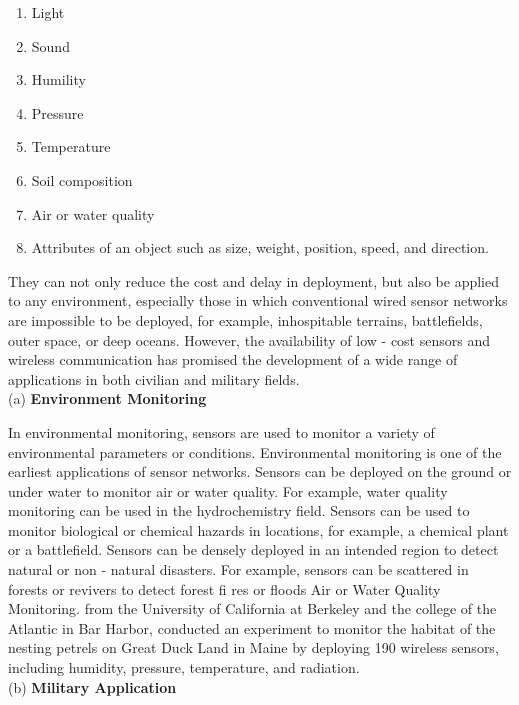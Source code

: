 \begin{enumerate}[label=\roman*]
  \item Light
\item Sound
\item Humility
\item Pressure
\item Temperature
\item Soil composition
\item Air or water quality
\item Attributes of an object such as size, weight, position, speed, and direction.
\end{enumerate}

They can not only reduce the cost and delay in deployment, but also be applied to any environment, especially those in which conventional wired sensor networks are impossible to be deployed, for example, inhospitable terrains, battlefields, outer space, or deep oceans. However, the availability of low - cost sensors and wireless communication has promised the development of a wide range of applications in both civilian and military fields.\\

(a) \textbf{Environment Monitoring}

In environmental monitoring, sensors are used to monitor a variety of environmental parameters or conditions. Environmental monitoring is one of the earliest applications of sensor networks. Sensors can be deployed on the ground or under water to monitor air or water quality. For example, water quality monitoring can be used in the hydrochemistry field. Sensors can be used to monitor biological or chemical hazards in locations, for example, a chemical plant or a battlefield. Sensors can be densely deployed in an intended region to detect natural or non - natural disasters. For example, sensors can be scattered in forests or revivers to detect forest fi res or floods Air or Water Quality Monitoring. from the University of California at Berkeley and the college of the Atlantic in Bar Harbor, conducted an experiment to monitor the habitat of the nesting petrels on Great Duck Land in Maine by deploying 190 wireless sensors, including humidity, pressure, temperature, and radiation.\\


 (b)	\textbf{Military Application}


